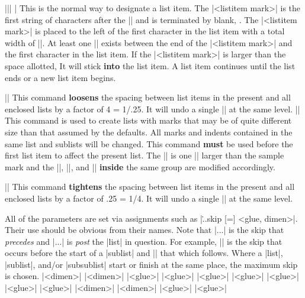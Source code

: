 \mbr\ext\@||\]| \li|
\nbr
This is the normal way to designate a list item. The |<listitem mark>| is the first
string of characters after the |\listitem| and is terminated by blank, \].
The |<listitem mark>| is placed to the left of the first character in the
list item with a total width of |\listitemmarksize|. At least one |\enspace|
exists between the end of the |<listitem mark>| and the first character in
the list item. If the |<listitem mark>| is larger than the space allotted, It
will stick {\bf into} the list item. 
A list item continues until the list ends or a new list item begins.

\mbr\ext\@|\loosenlist|
\nbr
This command {\bf loosens} the spacing between list items in the present and
all enclosed lists by a factor of 4 = 1/.25. It will undo a single
|\tightenlist| at the same level.
\mbr
\ext\@||
\nbr
This command is used to create lists with marks that may be of quite different
size than that assumed by the defaults. All marks and indents contained in
the same list and sublists will be changed. This command {\bf must} be used
before the first list item to affect the present list.
The |\listitemmarksize| is one |\enspace| larger than the
sample mark and the |\listindent|, |\sublistindent|, and |\subsublistindent|
{\bf inside} the same group are modified accordingly. 

\mbr\ext\@|\tightenlist|
\nbr
This command {\bf tightens} the spacing between list items in the present and
all enclosed lists by a factor of .25 = 1/4. It will undo a single
|\loosenlist| at the same level.
\endblockmode

All of the parameters are set via assignments such as
|\...skip [=] <glue, dimen>|. 
Their use should be obvious from their names. Note that |\pr...| is the skip
that {\it precedes} and |\po...| is  {\it post} the |list| in question.
For example, |\prsublistskip| is the skip that occurs before the start of a 
|sublist| and |\posublistskip| that which follows. Where a |list|, |sublist|,
and/or |subsublist| start or finish at the same place, the maximum skip is
chosen. 
\medbreak
\begintwocolumn
\ext\@|\listindent [=] <dimen>|
\ext\@|\listitemmarksize [=] <dimen>| 
\ext\@|\listitemskip [=] <glue>| 
\ext\@|\polistskip [=] <glue>|
\ext\@|\posublistskip [=] <glue>|
\ext\@|\posubsublistskip [=] <glue>|
\ext\@|\prlistskip [=] <glue>|
\ext\@|\prsublistskip [=] <glue>|
\ext\@|\prsubsublistskip [=] <glue>|
\ext\@|\sublistindent [=] <dimen>| 
\ext\@|\subsublistindent [=] <dimen>|
\ext\@|\sublistitemskip [=] <glue>|
\ext\@|\subsublistitemskip [=] <glue>|
\endthreecolumn
\ejectpage
\done